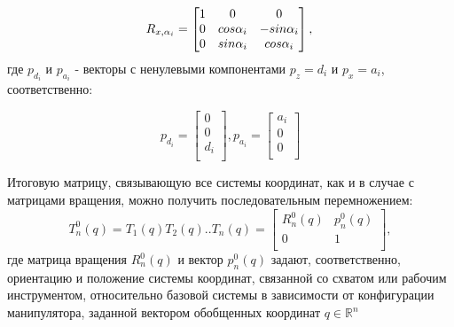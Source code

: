 \begin{equation*}\label{eq:model}
R_{x, \alpha_i} = 
     \begin{bmatrix}
    1 & 0 & 0\\
    0 & cos\alpha_i & -sin\alpha_i\\
    0 & sin\alpha_i & cos\alpha_i\\
    \end{bmatrix}
    , \\
\end{equation*} 
\hspace*{\parindent}где  $p_{d_i}$ и $p_{a_i}$ - векторы с ненулевыми компонентами $p_z= d_i$ и $p_x= a_i$, соответственно:

\begin{equation*}\label{eq:model}
 p_{d_i} = 
     \begin{bmatrix}
   0\\
   0\\
   d_i\\
    \end{bmatrix}
, p_{a_i} =
     \begin{bmatrix}
   a_i\\
   0\\
   0\\
    \end{bmatrix}
\end{equation*}

\hspace*{\parindent}Итоговую матрицу, связывающую все системы координат, как и в случае с матрицами вращения, можно получить последовательным перемножением:\\

\begin{equation*}\label{eq:model}
T_n^0(q) = T_1(q)T_2(q)..T_n(q) = 
     \begin{bmatrix}
    R_n^0(q) & p_n^0(q)\\
    0 & 1\\
    \end{bmatrix}
    ,
\end{equation*} 
\hspace*{\parindent}где матрица вращения  $R_n^0(q)$ и вектор $p_n^0(q)$ задают, соответственно, ориентацию и положение системы координат, связанной со схватом или рабочим инструментом, относительно базовой системы в зависимости от конфигурации манипулятора, заданной вектором обобщенных координат $q \in \mathbb {R}^n$